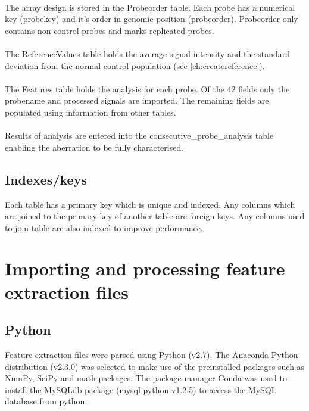 \paragraph*{}
The array design is stored in the Probeorder table. Each probe has a numerical key (probekey) and it's order in genomic position (probeorder). Probeorder only contains non-control probes and marks replicated probes.
\paragraph*{}
The ReferenceValues table holds the average signal intensity and the standard deviation from the normal control population (see \ref{ch:createreference}).
\paragraph*{}
The Features table holds the analysis for each probe. Of the 42 fields only the probename and processed signals are imported. The remaining fields are populated using information from other tables.
\paragraph*{}
Results of analysis are entered into the consecutive\_probe\_analysis table enabling the aberration to be fully characterised.

\subsection{Indexes/keys}
Each table has a primary key which is unique and indexed. 
Any columns which are joined to the primary key of another table are foreign keys.
Any columns used to join table are also indexed to improve performance.

\section{Importing and processing feature extraction files}
\subsection{Python}
Feature extraction files were parsed using Python (v2.7)\cite{python_software_foundation_python_2010}. The Anaconda Python distribution (v2.3.0) \cite{continuum_why_2016} was selected to make use of the preinstalled packages such as NumPy, SciPy and math packages. The package manager Conda was used to install the MySQLdb package (mysql-python v1.2.5)\cite{dustman2014} to access the MySQL database from python. 
